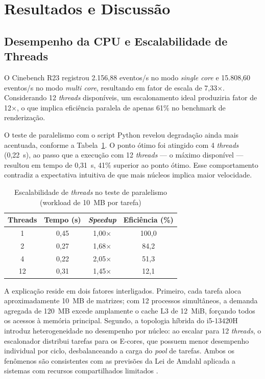 \documentclass[12pt]{article}
\begin{document}
\section{Resultados e Discussão}
\label{sec:res}

\subsection{Desempenho da CPU e Escalabilidade de Threads}

O Cinebench R23 registrou 2.156,88 eventos/s no modo \textit{single core} e 15.808,60 eventos/s no modo \textit{multi core}, resultando em fator de escala de 7,33×. Considerando 12 \textit{threads} disponíveis, um escalonamento ideal produziria fator de 12×, o que implica eficiência paralela de apenas 61\% no benchmark de renderização.

O teste de paralelismo com o script Python revelou degradação ainda mais acentuada, conforme a Tabela~\ref{tab:paralelismo}. O ponto ótimo foi atingido com 4 \textit{threads} (0,22~s), ao passo que a execução com 12 \textit{threads} — o máximo disponível — resultou em tempo de 0,31~s, 41\% superior ao ponto ótimo. Esse comportamento contradiz a expectativa intuitiva de que mais núcleos implica maior velocidade.

\begin{table}[H]
\centering
\caption{Escalabilidade de \textit{threads} no teste de paralelismo (workload de 10~MB por tarefa)}
\label{tab:paralelismo}
\begin{tabular}{cccc}
\toprule
\textbf{Threads} & \textbf{Tempo (s)} & \textbf{\textit{Speedup}} & \textbf{Eficiência (\%)} \\
\midrule
1  & 0,45 & 1,00× & 100,0 \\
2  & 0,27 & 1,68× & 84,2 \\
4  & 0,22 & 2,05× & 51,3 \\
12 & 0,31 & 1,45× & 12,1 \\
\bottomrule
\end{tabular}
\end{table}

A explicação reside em dois fatores interligados. Primeiro, cada tarefa aloca aproximadamente 10~MB de matrizes; com 12 processos simultâneos, a demanda agregada de 120~MB excede amplamente o cache L3 de 12~MiB, forçando todos os acessos à memória principal. Segundo, a topologia híbrida do i5-13420H introduz heterogeneidade no desempenho por núcleo: ao escalar para 12 \textit{threads}, o escalonador distribui tarefas para os E-cores, que possuem menor desempenho individual por ciclo, desbalanceando a carga do \textit{pool} de tarefas. Ambos os fenômenos são consistentes com as previsões da Lei de Amdahl aplicada a sistemas com recursos compartilhados limitados \cite{amdahl1967}.
\end{document}
